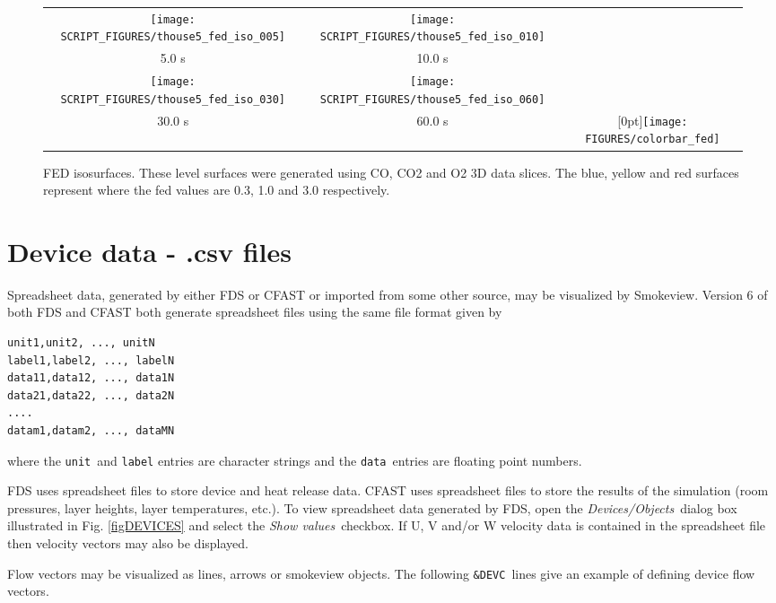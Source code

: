 \documentclass[11pt,twoside]{book}
\begin{document}
\begin{figure}[\figoptions]
\begin{center}
\begin{tabular}{ccc}
\texttt{[image: SCRIPT\_FIGURES/thouse5\_fed\_iso\_005]}&
\texttt{[image: SCRIPT\_FIGURES/thouse5\_fed\_iso\_010]}\\
5.0 s&10.0 s\\
\texttt{[image: SCRIPT\_FIGURES/thouse5\_fed\_iso\_030]}&
\texttt{[image: SCRIPT\_FIGURES/thouse5\_fed\_iso\_060]}&\\
30.0 s&60.0 s
&\raisebox{0.0ex}[0pt]{\texttt{[image: FIGURES/colorbar\_fed]}}\\
\end{tabular}
\caption [FED slices.]
{FED isosurfaces.
These level surfaces were generated using CO, CO2 and O2 3D data slices.
The blue, yellow and red surfaces represent where the
fed values are 0.3, 1.0 and 3.0 respectively.
}
\label{figfediso}%
\end{center}
\end{figure}

\section{Device data - .csv files}
Spreadsheet data, generated by either FDS or CFAST or imported from some
other source, may be visualized by Smokeview.
Version 6 of both FDS and CFAST
both generate spreadsheet files using the same file format given by
\begin{lstlisting}
unit1,unit2, ..., unitN
label1,label2, ..., labelN
data11,data12, ..., data1N
data21,data22, ..., data2N
....
datam1,datam2, ..., dataMN
\end{lstlisting}
where the {\tt unit}\ and {\tt label} entries are character strings and the
{\tt data}\ entries are floating point numbers.

FDS uses spreadsheet files to store device and heat release data.
CFAST uses spreadsheet files to store the results of the
simulation (room pressures, layer heights, layer temperatures,
etc.). To view spreadsheet data generated by FDS, open the {\em
Devices/Objects}\ dialog box illustrated in Fig.
\ref{figDEVICES} and select the {\em Show values}\ checkbox. If U,
V and/or W velocity data is contained in the spreadsheet file then
velocity vectors may also be displayed.

Flow vectors may be visualized as lines, arrows or smokeview objects.
The following {\tt \&DEVC}\ lines give an example of defining device flow vectors.
\end{document}
